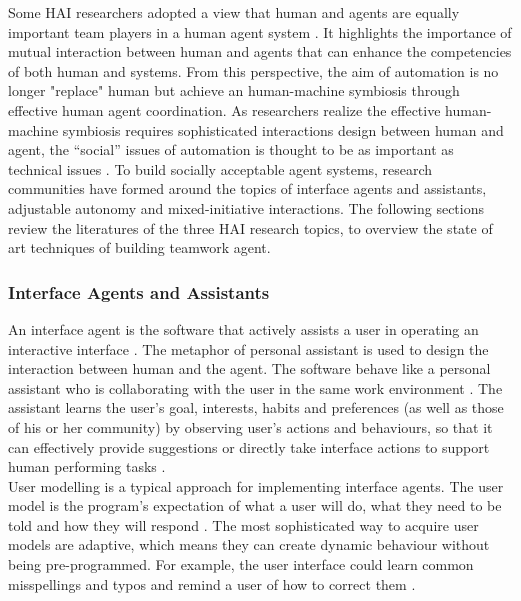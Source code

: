 Some \ac{HAI} researchers adopted a view that human and agents are equally important team players in a human agent system \cite{Sukthankara}. It highlights the importance of mutual interaction between human and agents that can enhance the competencies of both human and systems. From this perspective, the aim of automation is no longer "replace" human but achieve an human-machine symbiosis through effective human agent coordination. As researchers realize the effective human-machine symbiosis requires sophisticated interactions design between human and agent, the ``social'' issues of automation is thought to be as important as technical issues \cite{Bradshaw2011}. To build socially acceptable agent systems, research communities have formed around the topics of interface agents and assistants, adjustable autonomy and mixed-initiative interactions. The following sections review the literatures of the three \ac{HAI} research topics, to overview the state of art techniques of building teamwork agent. 

\subsubsection{Interface Agents and Assistants}\label{sec:lrinterfaceagent}
An interface agent is the software that actively assists a user in operating an interactive interface \cite{Lieberman2003}. The metaphor of personal assistant is used to design the interaction between human and the agent. The software behave like a personal assistant who is collaborating with the user in the same work environment \cite{Lieberman1997}. The assistant learns the user's goal, interests, habits and preferences (as well as those of his or her community) by observing user's actions and behaviours,  so that it can effectively provide suggestions or directly take interface actions to support human performing tasks \cite{Maes1994}.\\

User modelling is a typical approach for implementing interface agents. The user model is the program's expectation of what a user will do, what they need to be told and how they will respond \cite{Lieberman2003}.  The most sophisticated way to acquire user models are adaptive, which means they can create dynamic behaviour without being pre-programmed. For example, the user interface could learn common misspellings and typos and remind a user of how to correct them \cite{Lieberman2003}.\\

